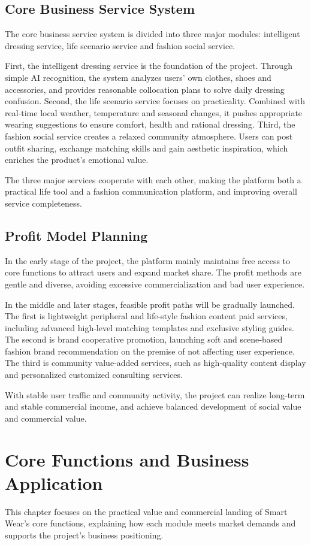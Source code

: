 \documentclass[12pt,a4paper]{article}
\begin{document}
\subsection{Core Business Service System}
The core business service system is divided into three major modules: intelligent dressing service, life scenario service and fashion social service.

First, the intelligent dressing service is the foundation of the project. Through simple AI recognition, the system analyzes users’ own clothes, shoes and accessories, and provides reasonable collocation plans to solve daily dressing confusion. Second, the life scenario service focuses on practicality. Combined with real‑time local weather, temperature and seasonal changes, it pushes appropriate wearing suggestions to ensure comfort, health and rational dressing. Third, the fashion social service creates a relaxed community atmosphere. Users can post outfit sharing, exchange matching skills and gain aesthetic inspiration, which enriches the product’s emotional value.

The three major services cooperate with each other, making the platform both a practical life tool and a fashion communication platform, and improving overall service completeness.
\subsection{Profit Model Planning}
In the early stage of the project, the platform mainly maintains free access to core functions to attract users and expand market share. The profit methods are gentle and diverse, avoiding excessive commercialization and bad user experience.

In the middle and later stages, feasible profit paths will be gradually launched. The first is lightweight peripheral and life‑style fashion content paid services, including advanced high‑level matching templates and exclusive styling guides. The second is brand cooperative promotion, launching soft and scene‑based fashion brand recommendation on the premise of not affecting user experience. The third is community value‑added services, such as high‑quality content display and personalized customized consulting services.

With stable user traffic and community activity, the project can realize long‑term and stable commercial income, and achieve balanced development of social value and commercial value.

\section{Core Functions and Business Application}
This chapter focuses on the practical value and commercial landing of Smart Wear’s core functions, explaining how each module meets market demands and supports the project’s business positioning.
\end{document}
